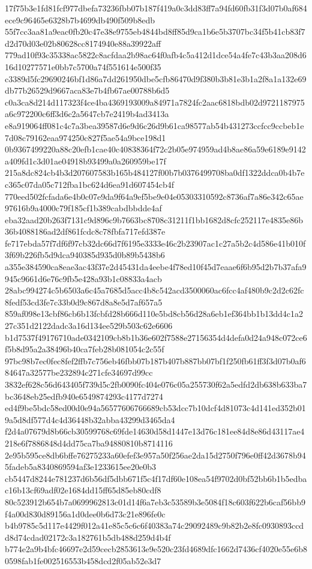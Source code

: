 \documentclass[11pt,a4paper]{article}
\begin{document}
{17f75b3e1fd81fcf977dbefa73236fbb07b187f419a0c3dd83ff7a94fd60fb31f3d07b0af684ece9c96465e6328b7b4699db490f509b8edb
55f7cc3aa81a9eac0fb20c47e38e9755eb4844bd8ff85d9ca1b6e5b3707bc34f5b41cb83f7d2d70d03e02b80628cc8174940e88a39922aff
779ad10f93c35338ac5822c8acfdaa2b98ac64f0afb4c5a412d1dce54a4fe7c43b3aa208d616d10277571e0bb7c5700a74f551614e500f35
c3389d5fc29690246bf1d86a7dd261950dbe5cfb86470d9f380b3b81e3b1a2f8a1a132e69db77b26529d9667aca83e7b4fb67ae00788b6d5
c0a3ca8d214d117323f4ce4ba4369193009a84971a7824fc2aac6818bdb02d9721187975a6c972200c6ff3d6c2a5647cb7e2419b4ad3413a
e8a919064ff081c4c7a3bea39587d6e9d6c26d9b61ca98577ab54b431273ccfcc9ccbeb1e7d08c79162eaa974250c827f5ae54a9bce198d1
0b9367499220a88c20efb1cae40c40838364f72c2b05e974959ad4b8ae86a59e6189e9142a409fd1c3d01ae04918b93499a0a260959be17f
215a8dc824cb4b3d207607583b165b484127f00b7b0376499708ba0df1322ddca0b4b7ec365c07da05c712fba1bc624d6ea91d607454cb4f
770eed502fcfada6e4b0c07e9da9f64a9ef5be9e04e05303310592c8736af7a86e342c65ae97616b9a4000c79f185cf1b389cabdbbdde4af
eba32aad20b263f7131c9d896c9b7663bc8708c31211f1bb1682d8cfc252117e4835e86b36b4088186ad2df861fcdc8c78fbfa717efd387e
fe717ebda57f7df6f97cb32dc66d7f6195e3333e46c2b23907ac1c27a5b2c4d586e41b010f3f69b226fb5d9dca940385d935d0b89b5438b6
a355e384590ca8eae3ac43f37e2d45431da4eebe4f78ed10f45d7eaae6f6b95d2b7b37afa9945c9661d6e76c9fb5e428a93b1c08833a4acb
28abc994274c5b6503a6c45a7685d5acc4b8c542acd3500060ac6fcc4af480b9c2d2c62fc8fedf53cd3fe7c33b0d9c867d8a8e5d7af657a5
859af098e13cbf86cb6b13fcbfd28b666d110e5bd8cb56d28a6eb1ef364bb1b13dd4c1a227c351d2122dadc3a16d134ee529b503c62e6606
b1d7537f49176710ade0342109cb8b1b36e602f7588e27156354d4defa0d24a948c072ce6f5b8d95a2a38496b40ca7feb28b081054c2c55f
97bc98b7ec0fec8fef2ffb7c756eb46fbb07b187b407b887bb07bf1f250fb61ff3f3d07b0af684647a32577be232894c271cfe34697d99cc
3832ef628c56d643405f739d5c2fb0090fc404e076c05a255730f62a5edfd2db638b633ba7bc3648eb25edfb940e6549874293c4177d7274
ed4f9be5bdc58ed00d0e94a56577606766689cb53dcc7b10dcf4d81073c4d141ed352b019a5d8df577d4c4d36448b32abba43299d3465da4
f2d4a07679d8b66cb30599768c69fde14630d58d1447e13d76c181ee84d8e86d43117ae4218e6f7886848d4dd75ca7ba94880810b8714116
2e95b595ce8db6bffe76275233a60efef3e957a50f256ae2da15d2750f796e0ff42d3678b945fadeb5a8340869594af3e1233615ee20e0b3
cb5447d8244e781237d6b56df5dbb671f5c4f17df60e108ea54f9702d0bf52bb6b1b5edbac16b13cf69adf02e1684dd15ff65d85eb80cdf8
80c523912b654b7a0699962813c01d14f6a7eb3c53589b3e5084f18c603f622b6caf56bb9f4a00d830d89156a1d0dee0b6d73c21e896fe0c
b4b9785c5d117e4429f012a41e85c5c6c6f40383a74c29092489c9b82b2e8fc0930893ccdd8d74cdad02172c3a182761b5db488d259d4b4f
b774e2a9b4bfc46697e2d59cecb2853613e9e520c23fd4689dfc1662d7436cf4020e55e6b80598fab1fe002516553b458dcd2f05ab52e3d7
}
\end{document}
